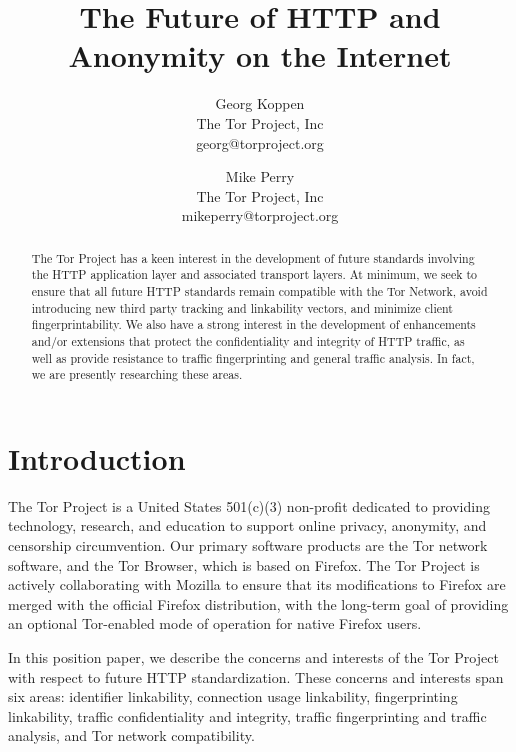 \documentclass[letterpaper,11pt]{llncs}
\begin{document}
\title{The Future of HTTP and Anonymity on the Internet}

\author{Georg Koppen \\ The Tor Project, Inc \\ georg@torproject.org}
\author{Mike Perry \\ The Tor Project, Inc \\ mikeperry@torproject.org}


\maketitle
\pagestyle{plain}

\begin{abstract}

The Tor Project has a keen interest in the development of future standards
involving the HTTP application layer and associated transport layers. At
minimum, we seek to ensure that all future HTTP standards remain compatible
with the Tor Network, avoid introducing new third party tracking and
linkability vectors, and minimize client fingerprintability. We also have a
strong interest in the development of enhancements and/or extensions that
protect the confidentiality and integrity of HTTP traffic, as well as provide
resistance to traffic fingerprinting and general traffic analysis. In fact, we
are presently researching these areas.

\end{abstract}

\section{Introduction}

The Tor Project is a United States 501(c)(3) non-profit dedicated to providing
technology, research, and education to support online privacy, anonymity, and
censorship circumvention. Our primary software products are the Tor network
software, and the Tor Browser, which is based on Firefox. The Tor Project is
actively collaborating with Mozilla to ensure that its modifications to
Firefox are merged with the official Firefox distribution, with the long-term
goal of providing an optional Tor-enabled mode of operation for native Firefox
users.

In this position paper, we describe the concerns and interests of the Tor
Project with respect to future HTTP standardization. These concerns and
interests span six areas: identifier linkability, connection usage linkability,
fingerprinting linkability, traffic confidentiality and integrity, traffic
fingerprinting and traffic analysis, and Tor network compatibility.
\end{document}
